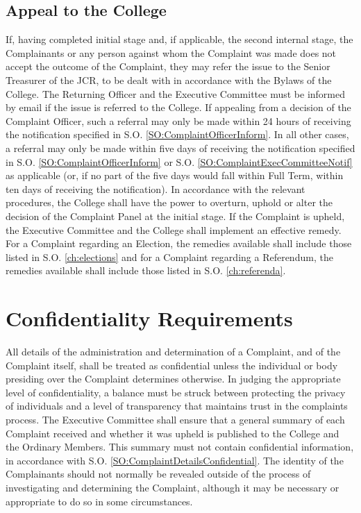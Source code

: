 \subsection{Appeal to the College}
\npara If, having completed initial stage and, if applicable, the second internal stage, the Complainants or any person against whom the Complaint was made does not accept the outcome of the Complaint, they may refer the issue to the Senior Treasurer of the JCR, to be dealt with in accordance with the Bylaws of the College.  The Returning Officer and the Executive Committee must be informed by email if the issue is referred to the College.
\npara If appealing from a decision of the Complaint Officer, such a referral may only be made within 24 hours of receiving the notification specified in S.O. \ref{SO:ComplaintOfficerInform}.  In all other cases, a referral may only be made within five days of receiving the notification specified in S.O. \ref{SO:ComplaintOfficerInform} or S.O. \ref{SO:ComplaintExecCommitteeNotif} as applicable (or, if no part of the five days would fall within Full Term, within ten days of receiving the notification).
\npara In accordance with the relevant procedures, the College shall have the power to overturn, uphold or alter the decision of the Complaint Panel at the initial stage.
\npara If the Complaint is upheld, the Executive Committee and the College shall implement an effective remedy.  For a Complaint regarding an Election, the remedies available shall include those listed in S.O. \ref{ch:elections} and for a Complaint regarding a Referendum, the remedies available shall include those listed in S.O. \ref{ch:referenda}.
\section{Confidentiality Requirements} \label{sec:ComplaintsConfidentiality}
\npara \label{SO:ComplaintDetailsConfidential} All details of the administration and determination of a Complaint, and of the Complaint itself, shall be treated as confidential unless the individual or body presiding over the Complaint determines otherwise.
\npara In judging the appropriate level of confidentiality, a balance must be struck between protecting the privacy of individuals and a level of transparency that maintains trust in the complaints process.
\npara The Executive Committee shall ensure that a general summary of each Complaint received and whether it was upheld is published to the College and the Ordinary Members.  This summary must not contain confidential information, in accordance with S.O. \ref{SO:ComplaintDetailsConfidential}.
\npara The identity of the Complainants should not normally be revealed outside of the process of investigating and determining the Complaint, although it may be necessary or appropriate to do so in some circumstances.





